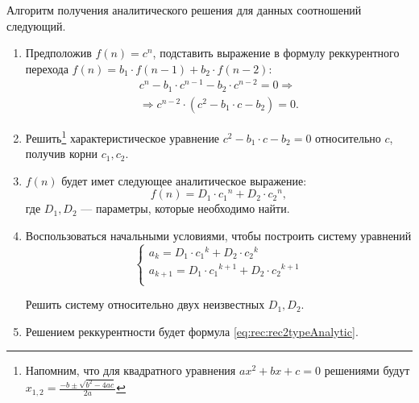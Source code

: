 Алгоритм получения аналитического решения для данных соотношений следующий.
\begin{enumerate}
    \item Предположив $f(n)=c^n$, подставить выражение в формулу реккурентного перехода $f(n)=b_1\cdot f(n-1)+b_2\cdot f(n-2)$: 
    \[
        \begin{split}
                        c^n-b_1\cdot c^{n-1}-b_2\cdot c^{n-2} = 0\Rightarrow\\
            \Rightarrow c^{n-2}\cdot(c^2 - b_1\cdot c - b_2) = 0.
        \end{split}
    \]
    
    \item Решить\footnote{Напомним, что для квадратного уравнения $ax^2+bx+c=0$ решениями будут $x_{1,2}=\frac{-b\pm\sqrt{b^2-4ac}}{2a}$} характеристическое уравнение $c^2 - b_1\cdot c - b_2 = 0$ относительно $c$, получив корни $c_1,c_2$.
    
    \item $f(n)$ будет имет следующее аналитическое выражение:
    \begin{equation}
        \label{eq:rec:rec2typeAnalytic}
        f(n)=D_1\cdot {c_1}^n + D_2\cdot{c_2}^n,
    \end{equation}
    где $D_1,D_2$ --- параметры, которые необходимо найти.
    
    \item Воспользоваться начальными условиями, чтобы построить систему уравнений
    \[
        \begin{cases}
            a_k     = D_1\cdot {c_1}^k + D_2\cdot{c_2}^k\\
            a_{k+1} = D_1\cdot {c_1}^{k+1} + D_2\cdot{c_2}^{k+1}\\            
        \end{cases}
    \]
    
    Решить систему относительно двух неизвестных $D_1,D_2$.
    
    \item Решением реккурентности будет формула \eqref{eq:rec:rec2typeAnalytic}.
\end{enumerate}

